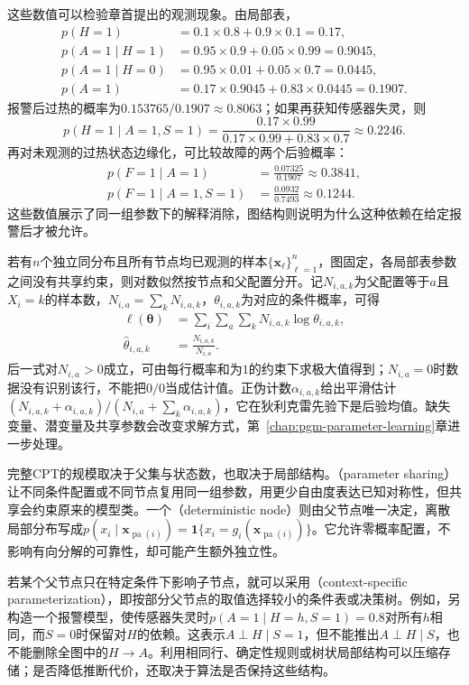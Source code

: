 这些数值可以检验章首提出的观测现象。由局部表，
\[
  \begin{aligned}
    p(H=1)&=0.1\times0.8+0.9\times0.1=0.17,\\
    p(A=1\mid H=1)&=0.95\times0.9+0.05\times0.99=0.9045,\\
    p(A=1\mid H=0)&=0.95\times0.01+0.05\times0.7=0.0445,\\
    p(A=1)&=0.17\times0.9045+0.83\times0.0445=0.1907.
  \end{aligned}
\]
报警后过热的概率为$0.153765/0.1907\approx0.8063$；如果再获知传感器失灵，则
\[
  p(H=1\mid A=1,S=1)
    =\frac{0.17\times0.99}
      {0.17\times0.99+0.83\times0.7}
    \approx0.2246.
\]
再对未观测的过热状态边缘化，可比较故障的两个后验概率：
\[
  \begin{aligned}
    p(F=1\mid A=1)&=\frac{0.07325}{0.1907}\approx0.3841,\\
    p(F=1\mid A=1,S=1)&=\frac{0.0932}{0.7493}\approx0.1244.
  \end{aligned}
\]
这些数值展示了同一组参数下的解释消除，图结构则说明为什么这种依赖在给定报警后才被允许。

若有$n$个独立同分布且所有节点均已观测的样本$\{\bm{x}_{\ell}\}_{\ell=1}^{n}$，图固定，各局部表参数之间没有共享约束，则对数似然按节点和父配置分开。记$N_{i,a,k}$为父配置等于$a$且$X_i=k$的样本数，$N_{i,a}=\sum_kN_{i,a,k}$，$\theta_{i,a,k}$为对应的条件概率，可得
\[
  \begin{aligned}
    \ell(\bm{\theta})
       &=\sum_i\sum_a\sum_kN_{i,a,k}\log\theta_{i,a,k},\\
    \widehat{\theta}_{i,a,k}&=\frac{N_{i,a,k}}{N_{i,a}}.
  \end{aligned}
\]
后一式对$N_{i,a}>0$成立，可由每行概率和为$1$的约束下求极大值得到；$N_{i,a}=0$时数据没有识别该行，不能把$0/0$当成估计值。正伪计数$\alpha_{i,a,k}$给出平滑估计$(N_{i,a,k}+\alpha_{i,a,k})/(N_{i,a}+\sum_k\alpha_{i,a,k})$，它在狄利克雷先验下是后验均值。缺失变量、潜变量及共享参数会改变求解方式，第~\ref{chap:pgm-parameter-learning}章进一步处理。

完整CPT的规模取决于父集与状态数，也取决于局部结构。（parameter sharing）让不同条件配置或不同节点复用同一组参数，用更少自由度表达已知对称性，但共享会约束原来的模型类。一个（deterministic node）则由父节点唯一决定，离散局部分布写成$p(x_i\mid\bm{x}_{\operatorname{pa}(i)})=\mathbf{1}\{x_i=g_i(\bm{x}_{\operatorname{pa}(i)})\}$。它允许零概率配置，不影响有向分解的可靠性，却可能产生额外独立性。

若某个父节点只在特定条件下影响子节点，就可以采用（context-specific parameterization），即按部分父节点的取值选择较小的条件表或决策树。例如，另构造一个报警模型，使传感器失灵时$p(A=1\mid H=h,S=1)=0.8$对所有$h$相同，而$S=0$时保留对$H$的依赖。这表示$A\perp H\mid S=1$，但不能推出$A\perp H\mid S$，也不能删除全图中的$H\to A$。利用相同行、确定性规则或树状局部结构可以压缩存储；是否降低推断代价，还取决于算法是否保持这些结构。

